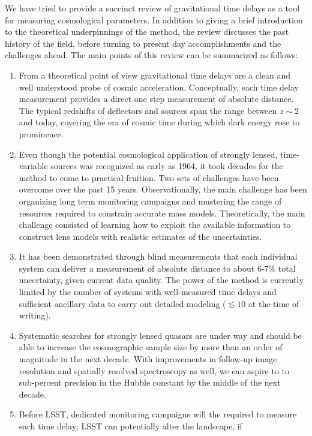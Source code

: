 We have tried to provide a succinct review of gravitational time delays as
a tool for measuring cosmological parameters. In addition to giving a
brief introduction to the theoretical underpinnings of the method, the
review discusses the past history of the field, before turning to
present day accomplishments and the challenges ahead. The main points
of this review can be summarized as follows:

\begin{enumerate}
\item From a theoretical point of view gravitational time delays are a
clean and well understood probe of cosmic acceleration. Conceptually,
each time delay measurement provides a direct one step measurement of
absolute distance. The typical redshifts of deflectors and sources span
the range between $z\sim2$ and today, covering the era of cosmic time
during which dark energy rose to prominence.
\item Even though the potential cosmological application of strongly
lensed, time-variable sources was recognized as early as 1964, it took
decades for the method to come to practical fruition. Two sets of
challenges have been overcome over the past 15 years. Observationally, the
main challenge has been organizing long term monitoring campaigns and
mustering the range of resources required to constrain accurate mass
models. Theoretically, the main challenge consisted of learning how to
exploit the available information to construct lens models with
realistic estimates of the uncertainties.
\item It has been demonstrated through blind measurements that each
individual system can deliver a measurement of absolute distance to
about 6-7\% total uncertainty, given current data quality.   The power of
the method is currently limited by the number of systems with
well-measured time delays and sufficient ancillary data to carry out
detailed modeling ($\lesssim10$ at the time of writing).
\item Systematic searches for strongly lensed quasars are under way and
should be able to increase the cosmographic sample size by more than an
order of magnitude in the next decade. With improvements in follow-up image
resolution and spatially resolved spectroscopy as well, we can aspire to
to sub-percent precision in the Hubble constant by the
middle of the next decade.
\item Before LSST, dedicated monitoring campaigns will the required to
measure each time delay; LSST can potentially alter the landscape, if

\end{enumerate}
